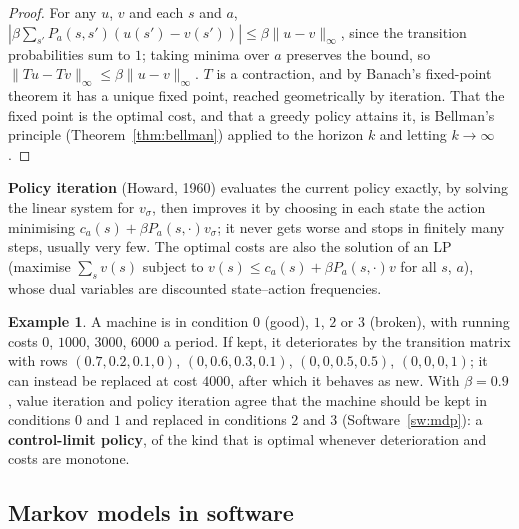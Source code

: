 \documentclass[11pt,a4paper]{article}
\numberwithin{equation}{section}
\theoremstyle{definition}
\newtheorem{exa}[thm]{Example}
\begin{document}
\begin{proof}
For any $u$, $v$ and each $s$ and $a$, $|\beta\sum_{s'}P_a(s, s')(u(s') - v(s'))| \leq \beta\|u - v\|_\infty$, since the transition probabilities sum to $1$; taking minima over $a$ preserves the bound, so $\|Tu - Tv\|_\infty \leq \beta\|u - v\|_\infty$. $T$ is a contraction, and by Banach's fixed-point theorem it has a unique
fixed point, reached geometrically by iteration. That the fixed point is the optimal cost, and that a greedy policy attains it, is Bellman's principle (Theorem~\ref{thm:bellman}) applied to the horizon $k$ and letting $k \to \infty$.
\end{proof}

\textbf{Policy iteration} (Howard, 1960) evaluates the current policy exactly, by solving the linear system for $v_\sigma$, then improves it by choosing in each state the action minimising $c_a(s) + \beta P_a(s, \cdot)v_\sigma$; it never gets worse and stops in finitely many steps, usually very few. The optimal costs are also the solution of an LP
(maximise $\sum_sv(s)$ subject to $v(s) \leq c_a(s) + \beta P_a(s, \cdot)v$ for all $s$, $a$), whose dual variables are discounted state--action frequencies.

\begin{exa}
\label{ex:mdpmachine}
A machine is in condition $0$ (good), $1$, $2$ or $3$ (broken), with running costs $0$, $1000$, $3000$, $6000$ a period. If kept, it deteriorates by the transition matrix with rows $(0.7, 0.2, 0.1, 0)$, $(0, 0.6, 0.3, 0.1)$, $(0, 0, 0.5, 0.5)$, $(0, 0, 0, 1)$; it can instead be replaced at cost $4000$, after which it behaves as new.
With $\beta = 0.9$, value iteration and policy iteration agree that the machine should be kept in conditions $0$ and $1$ and replaced in conditions $2$ and $3$ (Software~\ref{sw:mdp}): a \textbf{control-limit policy}, of the kind that is optimal whenever deterioration and costs are monotone.
\end{exa}

\subsection{Markov models in software}
\label{ssec:software15}
\end{document}
